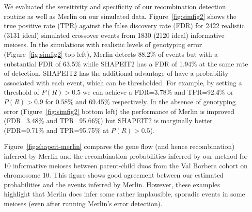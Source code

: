We evaluated the sensitivity and specificity of our recombination detection routine as well as Merlin on our simulated data.  Figure~\ref{fig:simfig2} shows the true positive rate (TPR) against the false discovery rate (FDR) for 2422 realistic (3131 ideal) simulated crossover events from 1830 (2120 ideal) informative meioses.  In the simulations with realistic levels of genotyping error (Figure~\ref{fig:simfig2} top left), Merlin detects 88.2\% of events but with a substantial FDR of 63.5\% while SHAPEIT2 has a FDR of 1.94\% at the same rate of detection. SHAPEIT2 has the additional advantage of have a probability associated with each event, which can be thresholded. For example, by setting a threshold of $P(R)>0.5$ we can achieve a FDR=3.78\% and TPR=92.4\% or $P(R)>0.9$ for 0.58\% and 69.45\% respectively. In the absence of genotyping error (Figure~\ref{fig:simfig2} bottom left) the performance of Merlin is improved (FDR=3.48\% and TPR=95.66\%) but SHAPEIT2 is marginally better (FDR=0.71\% and TPR=95.75\% at $P(R)>0.5$).

Figure~\ref{fig:shapeit-merlin} compares the gene flow (and hence recombination) inferred by Merlin and the recombination probabilities inferred by our method for 10 informative meioses between parent-child duos from the Val Borbera cohort on chromosome 10. This figure shows  good agreement between our estimated probabilities and the events inferred by Merlin. However, these examples highlight that Merlin does infer some rather implausible, sporadic events in some meioses (even after running Merlin's error detection).


